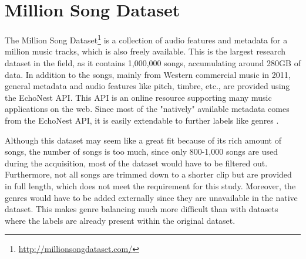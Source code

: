   \section{Million Song Dataset}
    The Million Song Dataset\footnote{\url{http://millionsongdataset.com/}} is a collection of audio features and metadata for a million music tracks, which is also freely available. This is the largest research dataset in the field, as it contains 1,000,000 songs, accumulating around 280GB of data. In addition to the songs, mainly from Western commercial music in 2011, general metadata and audio features like pitch, timbre, etc., are provided using the EchoNest API. This API is an online resource supporting many music applications on the web. Since most of the "natively" available metadata comes from the EchoNest API, it is easily extendable to further labels like genres \cite{bertin2011million}. \par
    Although this dataset may seem like a great fit because of its rich amount of songs, the number of songs is too much, since only 800-1,000 songs are used during the acquisition, most of the dataset would have to be filtered out. Furthermore, not all songs are trimmed down to a shorter clip but are provided in full length, which does not meet the requirement for this study. Moreover, the genres would have to be added externally since they are unavailable in the native dataset. This makes genre balancing much more difficult than with datasets where the labels are already present within the original dataset.


